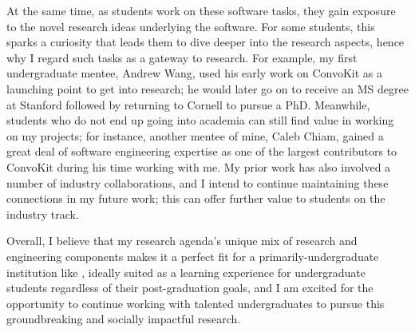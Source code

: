 \documentclass[12pt,letterpaper]{article}
\begin{document}
At the same time, as students work on these software tasks, they gain exposure to the novel research ideas underlying the software.
For some students, this sparks a curiosity that leads them to dive deeper into the research aspects, hence why I regard such tasks as a gateway to research.
For example, my first undergraduate mentee, Andrew Wang, used his early work on ConvoKit as a launching point to get into research; he would later go on to receive an MS degree at Stanford followed by returning to Cornell to pursue a PhD.
Meanwhile, students who do not end up going into academia can still find value in working on my projects; for instance, another mentee of mine, Caleb Chiam, gained a great deal of software engineering expertise as one of the largest contributors to ConvoKit during his time working with me.
My prior work has also involved a number of industry collaborations, and I intend to continue maintaining these connections in my future work; this can offer further value to students on the industry track.

Overall, I believe that my research agenda's unique mix of research and engineering components makes it
\ifliberalarts
a perfect fit for a primarily-undergraduate institution like \schoolname,
\else
ideally suited as a learning experience for undergraduate students regardless of their post-graduation goals,
\fi
and I am excited for the opportunity to continue working with talented undergraduates to pursue this groundbreaking and socially impactful research.

\vspace{0.5\baselineskip}
\printbibliography
\end{document}
